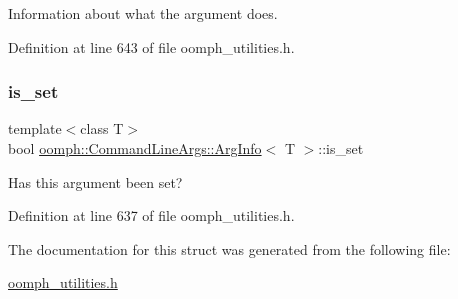 Information about what the argument does. 



Definition at line 643 of file oomph\+\_\+utilities.\+h.

\mbox{\label{structoomph_1_1CommandLineArgs_1_1ArgInfo_af45e9ad65b7fa4e29eed6a1e13b5d1e9}} 
\subsubsection{\texorpdfstring{is\+\_\+set}{is\_set}}
{\footnotesize\ttfamily template$<$class T$>$ \\
bool \hyperlink{structoomph_1_1CommandLineArgs_1_1ArgInfo}{oomph\+::\+Command\+Line\+Args\+::\+Arg\+Info}$<$ T $>$\+::is\+\_\+set}



Has this argument been set? 



Definition at line 637 of file oomph\+\_\+utilities.\+h.



The documentation for this struct was generated from the following file\+:\begin{DoxyCompactItemize}
\item 
\hyperlink{oomph__utilities_8h}{oomph\+\_\+utilities.\+h}\end{DoxyCompactItemize}
